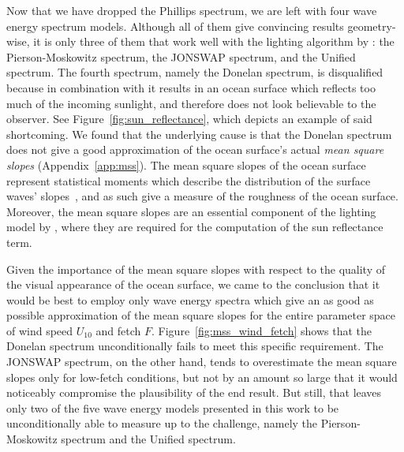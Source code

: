 %
Now that we have dropped the Phillips spectrum, we are left with four wave energy
spectrum models. Although all of them give convincing results geometry-wise,
it is only three of them that work well with the lighting algorithm by
\cite{article:oceanlighting}: the Pierson-Moskowitz spectrum, the JONSWAP
spectrum, and the Unified spectrum. The fourth spectrum, namely the Donelan
spectrum, is disqualified because in combination with \cite{article:oceanlighting}
it results in an ocean surface which reflects too much of the incoming sunlight,
and therefore does not look believable to the observer.
See Figure~\ref{fig:sun_reflectance}, which depicts an example of said shortcoming.
We found that the underlying cause is that the Donelan spectrum does not give
a good approximation of the ocean surface's actual \emph{mean square slopes}
(Appendix~\ref{app:mss}).
The mean square slopes of the ocean surface represent statistical moments
which describe the distribution of the surface waves' slopes~\citep{Massel:2011},
and as such give a measure of the roughness of the ocean surface.
Moreover, the mean square slopes are an essential component of the
lighting model by \cite{article:oceanlighting}, where they are required for
the computation of the sun reflectance term.

Given the importance of the mean square slopes with respect to the
quality of the visual appearance of the ocean surface, we came to
the conclusion that it would be best to employ only wave energy
spectra which give an as good as possible approximation of the mean
square slopes for the entire parameter space of wind speed $U_{10}$
and fetch $F$.
Figure~\ref{fig:mss_wind_fetch} shows that the Donelan spectrum
unconditionally fails to meet this specific requirement. The JONSWAP
spectrum, on the other hand, tends to overestimate the mean square slopes
only for low-fetch conditions, but not by an amount so large that it
would noticeably compromise the plausibility of the end result.
But still, that leaves only two of the five wave energy models presented
in this work to be unconditionally able to measure up to the challenge,
namely the Pierson-Moskowitz spectrum and the Unified spectrum.

